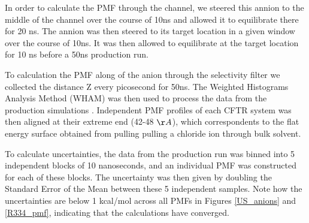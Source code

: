 In order to calculate the PMF through the channel, we steered this annion to the middle of the channel over the course of 10ns and allowed it to equilibrate there for 20 ns. The annion was then steered to its target location in a given window over the course of 10ns. It was then allowed to equilibrate at the target location for 10 ns before a 50ns production run.

To calculation the PMF along of the anion through the selectivity filter we collected the distance Z every picosecond for 50ns. The Weighted Histograms Analysis Method (WHAM) was then used to process the data from the production simulations \cite{grossfield2012}. Independent PMF profiles of each CFTR system was then aligned at their extreme end (42-48 $\AA$), which correspondents to the flat energy surface obtained from pulling pulling a chloride ion through bulk solvent. 

To calculate uncertainties, the data from the production run was binned into 5 independent blocks of 10 nanoseconds, and an individual PMF was constructed for each of these blocks. The uncertainty was then given by doubling the Standard Error of the Mean between these 5 independent samples. Note how the uncertainties are below 1 kcal/mol across all PMFs in Figures \ref{US_anions} and \ref{R334_pmf}, indicating that the calculations have converged.

